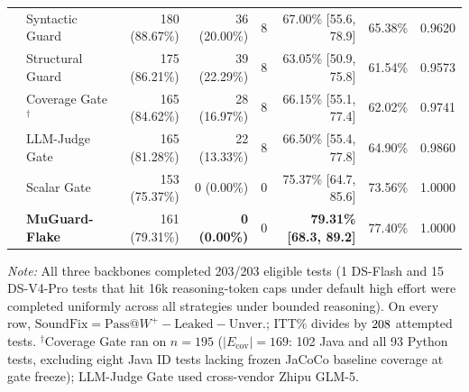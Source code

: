 \begin{table}[t]
\begin{tabular}{llrrrrrr}
 & Syntactic Guard & 180 (88.67\%) & 36 (20.00\%) & 8 & 67.00\% [55.6, 78.9] & 65.38\% & 0.9620 \\
 & Structural Guard & 175 (86.21\%) & 39 (22.29\%) & 8 & 63.05\% [50.9, 75.8] & 61.54\% & 0.9573 \\
 & Coverage Gate$^{\dagger}$ & 165 (84.62\%) & 28 (16.97\%) & 8 & 66.15\% [55.1, 77.4] & 62.02\% & 0.9741 \\
 & LLM-Judge Gate & 165 (81.28\%) & 22 (13.33\%) & 8 & 66.50\% [55.4, 77.8] & 64.90\% & 0.9860 \\
 & Scalar Gate & 153 (75.37\%) & 0 (0.00\%) & 0 & 75.37\% [64.7, 85.6] & 73.56\% & 1.0000 \\
 & \textbf{MuGuard-Flake} & 161 (79.31\%) & \textbf{0 (0.00\%)} & 0 & \textbf{79.31\% [68.3, 89.2]} & 77.40\% & 1.0000 \\
\bottomrule
\end{tabular}
\par\smallskip\parbox{0.97\textwidth}{\scriptsize\textit{Note:} All three backbones completed 203/203 eligible tests (1 DS-Flash and 15 DS-V4-Pro tests that hit 16k reasoning-token caps under default high effort were completed uniformly across all strategies under bounded reasoning). On every row, $\text{SoundFix} = \text{Pass@}W^+ - \text{Leaked} - \text{Unver.}$; ITT\% divides by $208$ attempted tests. $^{\dagger}$Coverage Gate ran on $n=195$ ($|E_{\text{cov}}|=169$: 102 Java and all 93 Python tests, excluding eight Java ID tests lacking frozen JaCoCo baseline coverage at gate freeze); LLM-Judge Gate used cross-vendor Zhipu GLM-5.}
\end{table}
